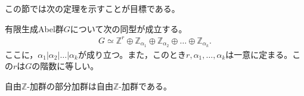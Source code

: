 \documentclass[uplatex]{jsarticle}
\begin{document}
この節では次の定理を示すことが目標である。

\begin{teiri}[有限生成Abel群の構造定理]
  有限生成Abel群$G$について次の同型が成立する。
  \begin{align}
    G \simeq \mathbb{Z}^{r} \oplus \mathbb{Z}_{\alpha_{1}} \oplus \mathbb{Z}_{\alpha_{2}} \oplus \dots \oplus \mathbb{Z}_{\alpha_{k}}.
  \end{align}
  ここに，$\alpha_{1} | \alpha_{2} | \dots | \alpha_{k}$が成り立つ。また，このとき$r, \alpha_{1}, \dots, \alpha_{k}$は一意に定まる。この$r$は$G$の階数に等しい。
\end{teiri}

\begin{hodai}
  \label{lem:10-1}
  自由$\mathbb{Z}$-加群の部分加群は自由$\mathbb{Z}$-加群である。
\end{hodai}
\end{document}
